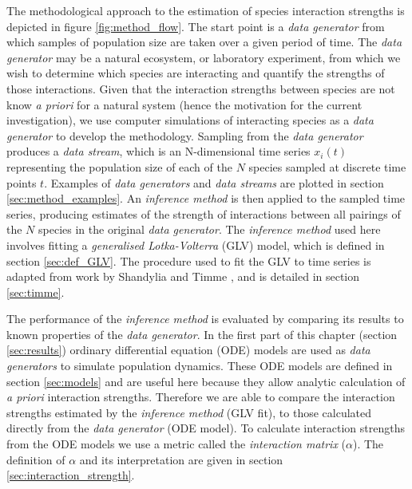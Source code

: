 The methodological approach to the estimation of species interaction strengths is depicted in figure \ref{fig:method_flow}. The start point is a \emph{data generator} from which samples of population size are taken over a given period of time. The \emph{data generator} may be a natural ecosystem, or laboratory experiment, from which we wish to determine which species are interacting and quantify the strengths of those interactions. Given that the interaction strengths between species are not know \emph{a priori} for a natural system (hence the motivation for the current investigation), we use computer simulations of interacting species as a \emph{data generator} to develop the methodology. Sampling from the \emph{data generator} produces a \emph{data stream}, which is an N-dimensional time series $x_i(t)$ representing the population size of each of the $N$ species sampled at discrete time points $t$. Examples of \emph{data generators} and \emph{data streams} are plotted in section \ref{sec:method_examples}. An \emph{inference method} is then applied to the sampled time series, producing estimates of the strength of interactions between all pairings of the $N$ species in the original \emph{data generator}. The \emph{inference method} used here involves fitting a \emph{generalised Lotka-Volterra} (GLV) model, which is defined in section \ref{sec:def_GLV}. The procedure used to fit the GLV to time series is adapted from work by Shandylia and Timme \cite{shandilya2011inferring}, and is detailed in section \ref{sec:timme}.

The performance of the \emph{inference method} is evaluated by comparing its results to known properties of the \emph{data generator}. In the first part of this chapter (section \ref{sec:results}) ordinary differential equation (ODE) models are used as \emph{data generators} to simulate population dynamics. These ODE models are defined in section \ref{sec:models} and are useful here because they allow analytic calculation of \emph{a priori} interaction strengths. Therefore we are able to compare the interaction strengths estimated by the \emph{inference method} (GLV fit), to those calculated directly from the \emph{data generator} (ODE model). To calculate interaction strengths from the ODE models we use a metric called the \emph{interaction matrix} ($\alpha$). The definition of $\alpha$ and its interpretation are given in section \ref{sec:interaction_strength}.

